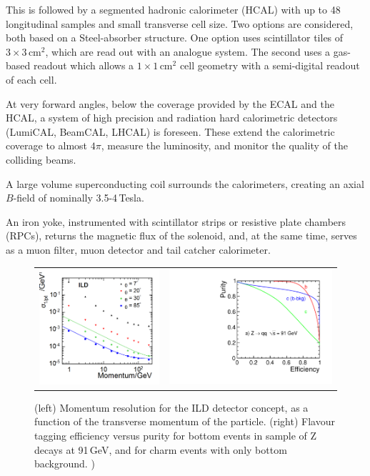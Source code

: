 This is followed by a segmented hadronic calorimeter (HCAL) with up to 48 longitudinal samples and small transverse cell size. Two 
options are considered, both based on a Steel-absorber structure. One option uses scintillator tiles of $3 \times 3$\,cm$^2$, 
which are read out with an analogue system. The second uses a gas-based readout which allows a $1 \times 1$\,cm$^2$ 
cell geometry with a semi-digital readout of each cell. 

At very forward angles, below the coverage provided by the ECAL and the HCAL, a system of high precision and radiation hard calorimetric detectors (LumiCAL, BeamCAL, LHCAL) is foreseen. These
extend the calorimetric coverage to almost $4\pi$, measure the luminosity, and  monitor the quality of the colliding beams.

A large volume superconducting coil surrounds the calorimeters, creating an axial $B$-field of nominally 3.5-4\,Tesla.

An iron  yoke, instrumented with scintillator strips or resistive plate chambers (RPCs), returns the magnetic flux of the solenoid, and, at the same time, serves as a muon filter, muon detector and tail catcher calorimeter.

\begin{figure}[b!]
\begin{tabular}{cc}

\includegraphics[width=0.5\hsize]{figures/deltaInvP_all_fits.png} &
\includegraphics[width=0.5\hsize]{figures/evalZ-lcfiweights_qq91new_v02-test.pdf}
\end{tabular}
\caption{\label{ild:fig:intro:tracking}(left) Momentum resolution for the ILD detector concept, as a function of the transverse momentum of the particle. (right) Flavour tagging efficiency versus purity for bottom events in sample of Z decays at 91\,GeV, and for charm events with only bottom background. )}
\end{figure}



